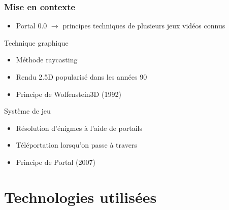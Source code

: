 \documentclass{beamer}
\begin{document}
\begin{frame}
    \label{sl: identical-numbers}
    \frametitle{Mise en contexte}
    \begin{block}{}
        \begin{itemize}
            \item Portal 0.0 $\rightarrow $ principes techniques de plusieurs jeux vidéos connus
        \end{itemize}
    \end{block}

    \begin{block}{Technique graphique}
        \begin{itemize}
            \item Méthode raycasting
            \item Rendu 2.5D popularisé dans les années 90
            \item Principe de Wolfenstein3D (1992)
        \end{itemize}
    \end{block}

    \begin{block}{Système de jeu}
        \begin{itemize}
            \item Résolution d'énigmes à l'aide de portails
            \item Téléportation lorsqu'on passe à travers
            \item Principe de Portal (2007)
        \end{itemize}
    \end{block}
\end{frame}

\section{Technologies utilisées}
\end{document}
